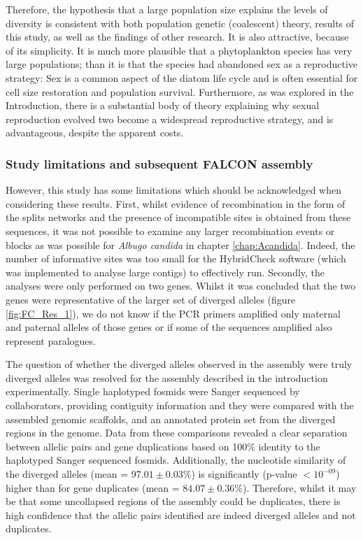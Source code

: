 Therefore, the hypothesis that a large population size explains the levels of diversity is consistent with both population genetic (coalescent) theory, results of this study, as well as the findings of other research.
It is also attractive, because of its simplicity.
It is much more plausible that a phytoplankton species has very large populations; than it is that the species had abandoned sex as a reproductive strategy:
Sex is a common aspect of the diatom life cycle and is often essential for cell size restoration and population survival.
Furthermore, as was explored in the Introduction, there is a substantial body of theory explaining why sexual reproduction evolved two become a widespread reproductive strategy, and is advantageous, despite the apparent costs.


\subsubsection{Study limitations and subsequent FALCON assembly}
However, this study has some limitations which should be acknowledged when considering these results.
First, whilst evidence of recombination in the form of the splits networks and the presence of incompatible sites is obtained from these sequences, it was not possible to examine any larger recombination events or blocks as was possible for \textit{Albugo candida} in chapter \ref{chap:Acandida}.
Indeed, the number of informative sites was too small for the HybridCheck software (which was implemented to analyse large contigs) to effectively run.
Secondly, the analyses were only performed on two genes.
Whilst it was concluded that the two genes were representative of the larger set of diverged alleles (figure \ref{fig:FC_Res_1}), we do not know if the PCR primers amplified only maternal and paternal alleles of those genes or if some of the sequences amplified also represent paralogues.

The question of whether the diverged alleles observed in the assembly were truly diverged alleles was resolved for the assembly described in the introduction experimentally.
Single haplotyped fosmids were Sanger sequenced by collaborators, providing contiguity information and they were compared with the assembled genomic scaffolds, and an annotated protein set from the diverged regions in the genome.
Data from these comparisons revealed a clear separation between allelic pairs and gene duplications based on 100\% identity to the haplotyped Sanger sequenced fosmids.
Additionally, the nucleotide similarity of the diverged alleles (mean = $97.01 \pm 0.03\%$) is significantly (p-value $< 10^{-09}$) higher than for gene duplicates (mean = $84.07 \pm 0.36\%$). 
Therefore, whilst it may be that some uncollapsed regions of the assembly could be duplicates, there is high confidence that the allelic pairs identified are indeed diverged alleles and not duplicates.

